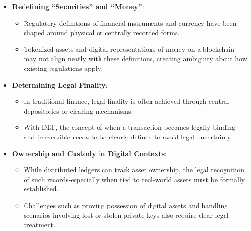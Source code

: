 \documentclass[conference]{IEEEtran}
\begin{document}
\begin{itemize}
    \item \textbf{Redefining ``Securities'' and ``Money''}:
    \begin{itemize}
        \item Regulatory definitions of financial instruments and currency have been shaped around physical or centrally recorded forms. 
        \item Tokenized assets and digital representations of money on a blockchain may not align neatly with these definitions, creating ambiguity about how existing regulations apply.
    \end{itemize}
    
    \item \textbf{Determining Legal Finality}:
    \begin{itemize}
        \item In traditional finance, legal finality is often achieved through central depositories or clearing mechanisms. 
        \item With DLT, the concept of when a transaction becomes legally binding and irreversible needs to be clearly defined to avoid legal uncertainty.
    \end{itemize}
    
    \item \textbf{Ownership and Custody in Digital Contexts}:
    \begin{itemize}
        \item While distributed ledgers can track asset ownership, the legal recognition of such records-especially when tied to real-world assets must be formally established. 
        \item Challenges such as proving possession of digital assets and handling scenarios involving lost or stolen private keys also require clear legal treatment.
    \end{itemize}
\end{itemize}
\end{document}
